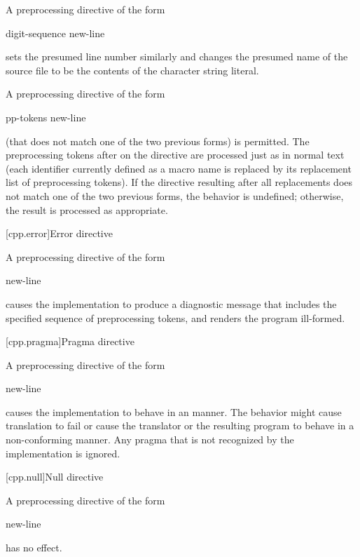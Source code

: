 \pnum
A preprocessing directive of the form
\begin{ncsimplebnf}
 digit-sequence    new-line
\end{ncsimplebnf}
sets the presumed line number similarly and changes the
presumed name of the source file to be the contents
of the character string literal.

\pnum
A preprocessing directive of the form
\begin{ncsimplebnf}
 pp-tokens new-line
\end{ncsimplebnf}
(that does not match one of the two previous forms)
is permitted.
The preprocessing tokens after
on the directive are processed just as in normal text
(each identifier currently defined as a macro name is replaced by its
replacement list of preprocessing tokens).
If the directive resulting after all replacements does not match
one of the two previous forms, the behavior is undefined;
otherwise, the result is processed as appropriate.

[cpp.error]{Error directive}%
%

\pnum
A preprocessing directive of the form
\begin{ncsimplebnf}
  new-line
\end{ncsimplebnf}
causes the implementation to produce
a diagnostic message that includes the specified sequence of preprocessing tokens,
and renders the program ill-formed.

[cpp.pragma]{Pragma directive}%
%

\pnum
A preprocessing directive of the form
\begin{ncsimplebnf}
  new-line
\end{ncsimplebnf}
causes the implementation to behave
in an  manner.
The behavior might cause translation to fail or cause the translator or
the resulting program to behave in a non-conforming manner.
Any pragma that is not recognized by the implementation is ignored.

[cpp.null]{Null directive}%

\pnum
A preprocessing directive of the form
\begin{ncsimplebnf}
\terminal{\#} new-line
\end{ncsimplebnf}
has no effect.

